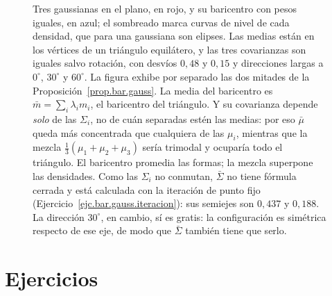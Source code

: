 \documentclass[12pt, a4paper]{amsbook}
\theoremstyle{remark}
\theoremstyle{definition}
\numberwithin{section}{chapter}
\numberwithin{subsection}{section}
\numberwithin{equation}{section}
\numberwithin{figure}{chapter}
\begin{document}
\begin{figure}[ht]
\caption{Tres gaussianas en el plano, en rojo, y su baricentro con pesos
iguales, en azul; el sombreado marca curvas de nivel de cada densidad, que
para una gaussiana son elipses. Las medias están en los vértices de un
triángulo equilátero, y las tres covarianzas son iguales salvo rotación, con
desvíos $0{,}48$ y $0{,}15$ y direcciones largas a $0^\circ$, $30^\circ$ y
$60^\circ$. La figura exhibe por separado las dos mitades de la
Proposición~\ref{prop.bar.gauss}. La media del baricentro es
$\bar m=\sum_i\lambda_im_i$, el baricentro del triángulo. Y su covarianza
depende \emph{solo} de las $\Sigma_i$, no de cuán separadas estén las medias:
por eso $\bar\mu$ queda más concentrada que cualquiera de las $\mu_i$, mientras
que la mezcla $\tfrac13(\mu_1+\mu_2+\mu_3)$ sería trimodal y ocuparía todo el
triángulo. El baricentro promedia las formas; la mezcla superpone las
densidades. Como las $\Sigma_i$ no conmutan, $\bar\Sigma$ no tiene fórmula
cerrada y está calculada con la iteración de punto fijo
(Ejercicio~\ref{ejc.bar.gauss.iteracion}): sus semiejes son $0{,}437$ y
$0{,}188$. La dirección $30^\circ$, en cambio, sí es gratis: la configuración
es simétrica respecto de ese eje, de modo que $\bar\Sigma$ también tiene que
serlo.}
\label{fig.bar.gauss}
\end{figure}


\section*{Ejercicios}
\end{document}
